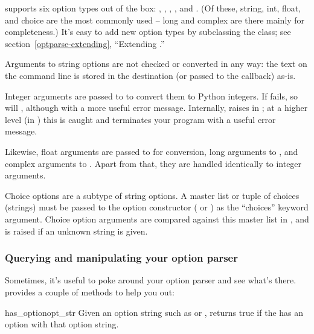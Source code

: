  supports six option types out of the box: ,
, , ,  and .
(Of these, string, int, float, and choice are the most commonly used
-- long and complex are there mainly for completeness.)  It's easy to
add new option types by subclassing the  class; see
section~\ref{optparse-extending}, ``Extending .''

Arguments to string options are not checked or converted in any way:
the text on the command line is stored in the destination (or passed
to the callback) as-is.

Integer arguments are passed to  to convert them to
Python integers.  If  fails, so will
, although with a more useful error message.
Internally,  raises  in
; at a higher level (in
) this is caught and  terminates
your program with a useful error message.

Likewise, float arguments are passed to  for
conversion, long arguments to , and complex arguments
to .  Apart from that, they are handled
identically to integer arguments.

Choice options are a subtype of string options. A master list or
tuple of choices (strings) must be passed to the option constructor
( or ) as
the ``choices'' keyword argument. Choice option arguments are
compared against this master list in
, and 
is raised if an unknown string is given.

\subsubsection{Querying and manipulating your option parser\label{optparse-querying-and-manipulating}}

Sometimes, it's useful to poke around your option parser and see what's
there.  provides a couple of methods to help you out:

\begin{methoddesc}{has_option}{opt_str}
    Given an option string such as  or
    , returns true if the 
    has an option with that option string.
\end{methoddesc}

